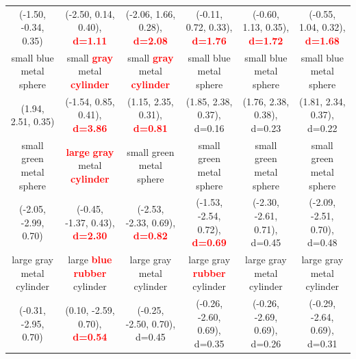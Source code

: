 \documentclass{article}
\begin{document}
\begin{table}[ht!]
{\begin{tabular}{cccccc}
      (-1.50, -0.34, 0.35) &                                                    (-2.50, 0.14, 0.40), \textcolor{red}{\textbf{d=1.11}} &                          (-2.06, 1.66, 0.28), \textcolor{red}{\textbf{d=2.08}} &   (-0.11, 0.72, 0.33), \textcolor{red}{\textbf{d=1.76}} &   (-0.60, 1.13, 0.35), \textcolor{red}{\textbf{d=1.72}} &  (-0.55, 1.04, 0.32), \textcolor{red}{\textbf{d=1.68}} \\
    small blue metal sphere &                            small \textcolor{red}{\textbf{gray}} metal \textcolor{red}{\textbf{cylinder}} &  small \textcolor{red}{\textbf{gray}} metal \textcolor{red}{\textbf{cylinder}} &                                 small blue metal sphere &                                 small blue metal sphere &                                small blue metal sphere \\
         (1.94, 2.51, 0.35) &                                                    (-1.54, 0.85, 0.41), \textcolor{red}{\textbf{d=3.86}} &                           (1.15, 2.35, 0.31), \textcolor{red}{\textbf{d=0.81}} &                              (1.85, 2.38, 0.37), d=0.16 &                              (1.76, 2.38, 0.38), d=0.23 &                             (1.81, 2.34, 0.37), d=0.22 \\
  small green metal sphere &  \textcolor{red}{\textbf{large}} \textcolor{red}{\textbf{gray}} metal \textcolor{red}{\textbf{cylinder}} &                                                       small green metal sphere &                                small green metal sphere &                                small green metal sphere &                               small green metal sphere \\
      (-2.05, -2.99, 0.70) &                                                   (-0.45, -1.37, 0.43), \textcolor{red}{\textbf{d=2.30}} &                         (-2.53, -2.33, 0.69), \textcolor{red}{\textbf{d=0.82}} &  (-1.53, -2.54, 0.72), \textcolor{red}{\textbf{d=0.69}} &                            (-2.30, -2.61, 0.71), d=0.45 &                           (-2.09, -2.51, 0.70), d=0.48 \\
  large gray metal cylinder &                           large \textcolor{red}{\textbf{blue}} \textcolor{red}{\textbf{rubber}} cylinder &                                                      large gray metal cylinder &    large gray \textcolor{red}{\textbf{rubber}} cylinder &                               large gray metal cylinder &                              large gray metal cylinder \\
      (-0.31, -2.95, 0.70) &                                                    (0.10, -2.59, 0.70), \textcolor{red}{\textbf{d=0.54}} &                                                   (-0.25, -2.50, 0.70), d=0.45 &                            (-0.26, -2.60, 0.69), d=0.35 &                            (-0.26, -2.69, 0.69), d=0.26 &                           (-0.29, -2.64, 0.69), d=0.31 \\

\end{tabular}}
\end{table}
\end{document}
